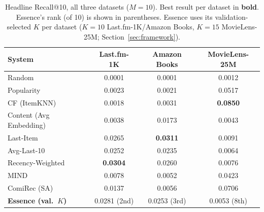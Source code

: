 \documentclass[11pt,a4paper]{article}
\begin{document}
\begin{table}[htbp]
\centering
\caption{Headline Recall@10, all three datasets ($M=10$). Best result per
         dataset in \textbf{bold}. Essence's rank (of 10) is shown in
         parentheses. Essence uses its validation-selected $K$ per dataset
         ($K=10$ Last.fm-1K/Amazon Books, $K=15$ MovieLens-25M;
         Section~\ref{sec:framework}).}
\label{tab:headline-recall}
\begin{tabular}{lccc}
\toprule
\textbf{System} & \textbf{Last.fm-1K} & \textbf{Amazon Books} & \textbf{MovieLens-25M} \\
\midrule
Random                   & 0.0001 & 0.0001 & 0.0012 \\
Popularity               & 0.0023 & 0.0021 & 0.0517 \\
CF (ItemKNN)             & 0.0018 & 0.0031 & \textbf{0.0850} \\
Content (Avg Embedding)  & 0.0038 & 0.0173 & 0.0043 \\
Last-Item                & 0.0265 & \textbf{0.0311} & 0.0091 \\
Avg-Last-10              & 0.0252 & 0.0235 & 0.0064 \\
Recency-Weighted         & \textbf{0.0304} & 0.0260 & 0.0076 \\
MIND                     & 0.0078 & 0.0052 & 0.0423 \\
ComiRec (SA)             & 0.0137 & 0.0056 & 0.0706 \\
\textbf{Essence (val.\ $K$)} & 0.0281 (2nd) & 0.0253 (3rd) & 0.0053 (8th) \\
\bottomrule
\end{tabular}
\end{table}
\end{document}
